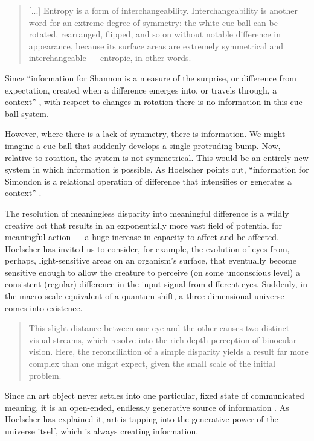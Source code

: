 \documentclass[letterpaper]{article}
\begin{document}
    \begin{quote}
        [...] Entropy is a form of interchangeability. Interchangeability is another word for an extreme degree of symmetry: the white cue ball can be rotated, rearranged, flipped, and so on without notable difference in appearance, because its surface areas are extremely symmetrical and interchangeable — entropic, in other words. \citep[p.4]{HoelscherThMxmmPtntlEntrpy2017}
    \end{quote}

    Since “information for Shannon is a measure of the surprise, or difference from expectation, created when a difference emerges into, or travels through, a context” \citep[p.6]{HoelscherArtAsInfrmtn2021}, with respect to changes in rotation there is no information in this cue ball system. 
    
    However, where there is a lack of symmetry, there is information. We might imagine a cue ball that suddenly develops a single protruding bump. Now, relative to rotation, the system is not symmetrical. This would be an entirely new system in which information is possible. As Hoelscher points out, “information for Simondon is a relational operation of difference that intensifies or generates a context” \citep[p.6]{HoelscherArtAsInfrmtn2021}. 

    The resolution of meaningless disparity into meaningful difference is a wildly creative act that results in an exponentially more vast field of potential for meaningful action — a huge increase in capacity to affect and be affected. Hoelscher has invited us to consider, for example, the evolution of eyes from, perhaps, light-sensitive areas on an organism's surface, that eventually become sensitive enough to allow the creature to perceive (on some unconscious level) a consistent (regular) difference in the input signal from different eyes. Suddenly, in the macro-scale equivalent of a quantum shift, a three dimensional universe comes into existence.

    \begin{quote}
        This slight distance between one eye and the other causes two distinct visual streams, which resolve into the rich depth perception of binocular vision. Here, the reconciliation of a simple disparity yields a result far more complex than one might expect, given the small scale of the initial problem. \citep[p.5]{HoelscherArtAsInfrmtn2021}
    \end{quote}

    Since an art object never settles into one particular, fixed state of communicated meaning, it is an open-ended, endlessly generative source of information \citep[p.7]{HoelscherThPtcsOfPhsSpc2014}. As Hoelscher has explained it, art is tapping into the generative power of the universe itself, which is always creating information.
\end{document}
